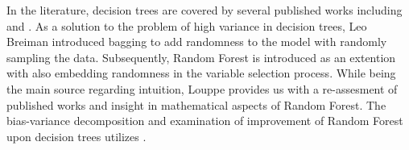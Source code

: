 In the literature, 
decision trees are covered by several published works including 
\cite{breiman1984classification} and \cite{friedman2001elements}.
As a solution to the problem of high variance in decision trees, 
Leo Breiman introduced bagging to add randomness to the model 
with randomly sampling the data\cite{breiman1996bagging}. 
Subsequently, Random Forest is introduced as an extention with 
also embedding randomness in the variable selection process\cite{breiman2001random}. 
While \cite{friedman2001elements} being the main source regarding intuition,
Louppe provides us with a re-assesment of published works and insight in 
mathematical aspects of Random Forest\cite{louppe2014understanding}.
The bias-variance decomposition and examination of improvement of Random Forest upon decision trees utilizes 
\cite{james2003variance}\cite{domingos2000decomposition}\cite{friedman1997zeroLoss}\cite{kohavi1996bias}.
